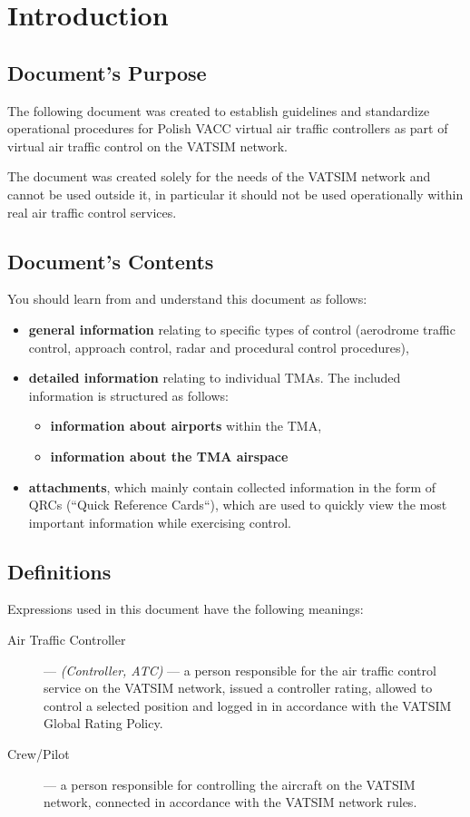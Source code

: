 \chapter{Introduction}%
\label{ch:introduction}
\section{Document's Purpose}
The following document was created to establish guidelines and standardize operational procedures for Polish VACC virtual air traffic controllers as part of virtual air traffic control on the VATSIM network.

The document was created solely for the needs of the VATSIM network and cannot be used outside it, in particular it should not be used operationally within real air traffic control services.

\section{Document's Contents}
You should learn from and understand this document as follows:
\begin{itemize}
\item \textbf{general information} relating to specific types of control (aerodrome traffic control, approach control, radar and procedural control procedures),
\item \textbf{detailed information} relating to individual TMAs. The included information is structured as follows:
\begin{itemize}
\item \textbf{information about airports} within the TMA,
\item \textbf{information about the TMA airspace}
\end{itemize}
\item \textbf{attachments}, which mainly contain collected information in the form of QRCs (``Quick Reference Cards``), which are used to quickly view the most important information while exercising control.
\end{itemize}

\section{Definitions}
Expressions used in this document have the following meanings:
\begin{description}
    \item[Air Traffic Controller] --- \textit{(Controller, ATC)} --- a person responsible for the air traffic control service on the VATSIM network, issued a controller rating, allowed to control a selected position and logged in in accordance with the VATSIM Global Rating Policy.
    \item[Crew/Pilot] --- a person responsible for controlling the aircraft on the VATSIM network, connected in accordance with the VATSIM network rules.
\end{description}

